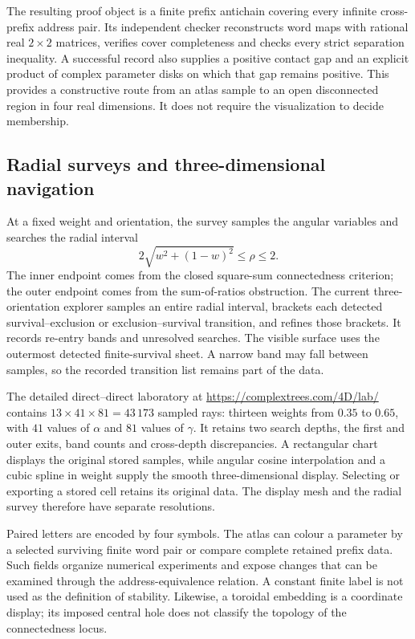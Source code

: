 The resulting proof object is a finite prefix antichain covering every infinite
cross-prefix address pair. Its independent checker reconstructs word maps with
rational real $2\times2$ matrices, verifies cover completeness and checks every
strict separation inequality. A successful record also supplies a positive
contact gap and an explicit product of complex parameter disks on which that
gap remains positive. This provides a constructive route from an atlas sample
to an open disconnected region in four real dimensions. It does not require
the visualization to decide membership.

\subsection{Radial surveys and three-dimensional navigation}
At a fixed weight and orientation, the survey samples the angular variables and
searches the radial interval
\[
 2\sqrt{w^2+(1-w)^2}\leq\rho\leq2.
\]
The inner endpoint comes from the closed square-sum connectedness criterion;
the outer endpoint comes from the sum-of-ratios obstruction. The current
three-orientation explorer samples an entire radial interval, brackets each
detected survival--exclusion or exclusion--survival transition, and refines
those brackets. It records re-entry bands and unresolved searches. The visible
surface uses the outermost detected finite-survival sheet. A narrow band may
fall between samples, so the recorded transition list remains part of the data.

The detailed direct--direct laboratory at \url{https://complextrees.com/4D/lab/}
contains $13\times41\times81=43\,173$ sampled rays: thirteen weights from
$0.35$ to $0.65$, with $41$ values of $\alpha$ and $81$ values of $\gamma$.
It retains two search depths, the first and outer exits, band counts and
cross-depth discrepancies. A rectangular chart displays the original stored
samples, while angular cosine interpolation and a cubic spline in weight
supply the smooth three-dimensional display. Selecting or exporting a stored
cell retains its original data. The display mesh and the radial survey therefore
have separate resolutions.

Paired letters are encoded by four symbols. The atlas can colour a parameter by
a selected surviving finite word pair or compare complete retained prefix data.
Such fields organize numerical experiments and expose changes that can be
examined through the address-equivalence relation. A constant finite label is
not used as the definition of stability. Likewise, a toroidal embedding is a
coordinate display; its imposed central hole does not classify the topology of
the connectedness locus.

